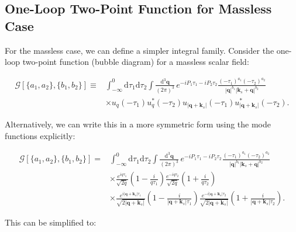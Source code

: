 \documentclass[a4paper,12pt]{article}
\def\di{{\mathrm{d}}}
\begin{document}
\subsection{One-Loop Two-Point Function for Massless Case}

For the massless case, we can define a simpler integral family. Consider the one-loop two-point function (bubble diagram) for a massless scalar field:

\begin{equation}
	\begin{split}
		\mathcal{G}[\{a_1,a_2\},\{b_1,b_2\}] \equiv & \int_{-\infty}^0 \di\tau_1\di\tau_2 \int \frac{\di^3\bm q}{(2\pi)^3} \,
		e^{-iP_1\tau_1 - iP_2\tau_2} \frac{(-\tau_1)^{a_1}(-\tau_2)^{a_2}}{|\bm q|^{b_1}|\bm k_s+\bm q|^{b_2}}                                      \\
		                                            & \times u_q(-\tau_1)u_q^*(-\tau_2) u_{|\bm q+\bm k_s|}(-\tau_1)u_{|\bm q+\bm k_s|}^*(-\tau_2).
	\end{split}
\end{equation}

Alternatively, we can write this in a more symmetric form using the mode functions explicitly:

\begin{equation}
	\begin{split}
		\mathcal{G}[\{a_1,a_2\},\{b_1,b_2\}] = & \int_{-\infty}^0 \di\tau_1\di\tau_2 \int \frac{\di^3\bm q}{(2\pi)^3} \,
		e^{-iP_1\tau_1 - iP_2\tau_2} \frac{(-\tau_1)^{a_1}(-\tau_2)^{a_2}}{|\bm q|^{b_1}|\bm k_s+\bm q|^{b_2}}                                                                             \\
		                                       & \times \frac{e^{iq\tau_1}}{\sqrt{2q}}\left(1 - \frac{i}{q\tau_1}\right) \frac{e^{-iq\tau_2}}{\sqrt{2q}}\left(1 + \frac{i}{q\tau_2}\right) \\
		                                       & \times \frac{e^{i|\bm q+\bm k_s|\tau_1}}{\sqrt{2|\bm q+\bm k_s|}}\left(1 - \frac{i}{|\bm q+\bm k_s|\tau_1}\right)
		\frac{e^{-i|\bm q+\bm k_s|\tau_2}}{\sqrt{2|\bm q+\bm k_s|}}\left(1 + \frac{i}{|\bm q+\bm k_s|\tau_2}\right).
	\end{split}
\end{equation}

This can be simplified to:
\end{document}
